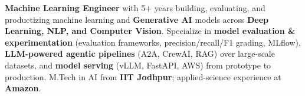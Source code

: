 \documentclass[letter,10pt]{article}
\begin{document}

\textbf{Machine Learning Engineer} with 5+ years building, evaluating, and productizing machine learning and \textbf{Generative AI} models across \textbf{Deep Learning, NLP, and Computer Vision}.
Specialize in \textbf{model evaluation \& experimentation} (evaluation frameworks, precision/recall/F1 grading, MLflow), \textbf{LLM-powered agentic pipelines} (A2A, CrewAI, RAG) over large-scale datasets, and \textbf{model serving} (vLLM, FastAPI, AWS) from prototype to production.
M.Tech in AI from \textbf{IIT Jodhpur}; applied-science experience at \textbf{Amazon}.
\end{document}
